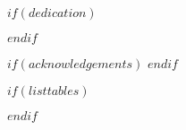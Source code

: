 \documentclass[12pt,final,CPage]{ufthesis} %
\begin{document}






\maketitle
\makecopyright


$if(dedication)$
	\dedication{$dedication$}
$endif$ %


$if(acknowledgements)$
$endif$ %


\tableofcontents %

$if(listtables)$
  \listoftables %
$endif$

\end{document}
